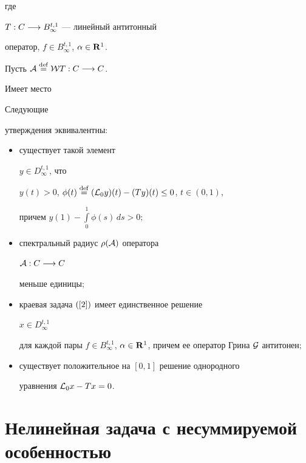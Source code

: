 где


$T : { C}\longrightarrow { B}^{t,1}_{\infty}$ --- линейный антитонный


оператор, $f\in { B}_{\infty}^{t,1}$, $\alpha\in {\bold R}^1$.





Пусть ${\cal A}\overset{\mathrm{def}}{=}{} {\cal W}T :{ C}\longrightarrow { C}$.


Имеет место





\begin{lem}


Следующие


утверждения эквивалентны$:$


\begin{itemize}


\item[1)] существует такой элемент


$y\in D^{t,1}_{\infty}$, что


$y(t) > 0$, $\phi (t)\eqdef ({\cal L}_0 y)(t)-(Ty)(t)\le 0$, $t\in


(0,1)$,


причем $y(1) -\int\limits_0^1\phi (s)\, ds>0;$


\item[2)] спектральный радиус $\rho ({\cal A})$ оператора


${\cal A} : C\longrightarrow C$


меньше единицы$;$


\item[3)] краевая задача $(\ref{2})$ имеет единственное решение


$x\in D^{t,1}_{\infty}$


для каждой пары $f\in B^{t,1}_{\infty}$, $\alpha\in


\bold R^1$, причем ее оператор Грина ${\cal G}$ антитонен$;$


\item[4)] существует положительное на $[0,1]$ решение однородного


уравнения ${\cal L}_0 x - Tx=0$.


\end{itemize}


\end{lem}





\section{Нелинейная задача с несуммируемой особенностью}





